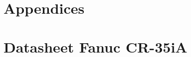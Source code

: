 \appendixpagenumbering
\chapter*{Appendices}


\chapter{Datasheet Fanuc CR-35iA}
\label{app:datafanuc}
\begin{figure}[b]

\end{figure}

